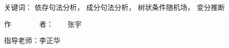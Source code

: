 
\begin{cabstract}

    \vskip 21bp
        {\heiti{} 关键词：}
    依存句法分析，
    成分句法分析，
    树状条件随机场，
    变分推断

    \begin{flushright}
        作~~~~~~~~者：~~~~张宇

        指导老师：李正华

    \end{flushright}


\end{cabstract}


